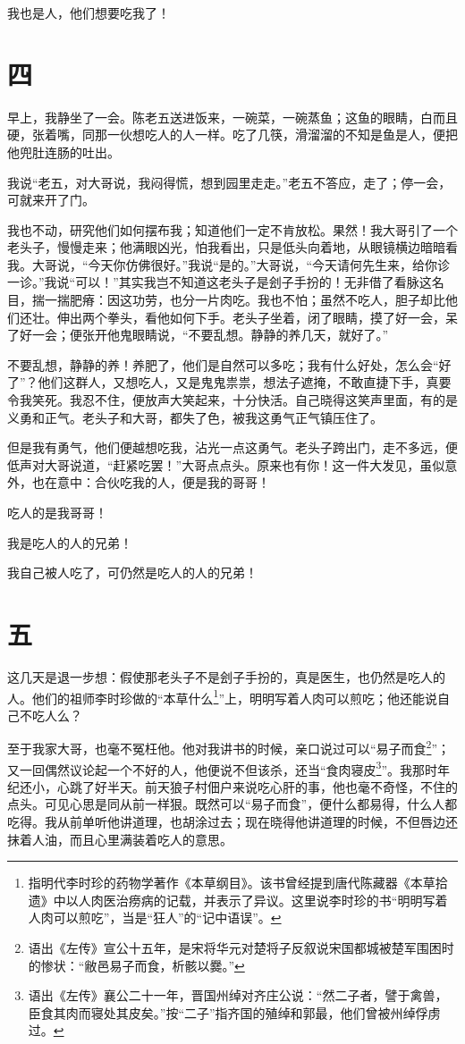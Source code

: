 \documentclass[12pt,UTF8]{ctexbook}
\begin{document}
我也是人，他们想要吃我了！

\section{四}

早上，我静坐了一会。陈老五送进饭来，一碗菜，一碗蒸鱼；这鱼的眼睛，白而且硬，张着嘴，同那一伙想吃人的人一样。吃了几筷，滑溜溜的不知是鱼是人，便把他兜肚连肠的吐出。

我说“老五，对大哥说，我闷得慌，想到园里走走。”老五不答应，走了；停一会，可就来开了门。

我也不动，研究他们如何摆布我；知道他们一定不肯放松。果然！我大哥引了一个老头子，慢慢走来；他满眼凶光，怕我看出，只是低头向着地，从眼镜横边暗暗看我。大哥说，“今天你仿佛很好。”我说“是的。”大哥说，“今天请何先生来，给你诊一诊。”我说“可以！”其实我岂不知道这老头子是刽子手扮的！无非借了看脉这名目，揣一揣肥瘠：因这功劳，也分一片肉吃。我也不怕；虽然不吃人，胆子却比他们还壮。伸出两个拳头，看他如何下手。老头子坐着，闭了眼睛，摸了好一会，呆了好一会；便张开他鬼眼睛说，“不要乱想。静静的养几天，就好了。”

不要乱想，静静的养！养肥了，他们是自然可以多吃；我有什么好处，怎么会“好了”？他们这群人，又想吃人，又是鬼鬼祟祟，想法子遮掩，不敢直捷下手，真要令我笑死。我忍不住，便放声大笑起来，十分快活。自己晓得这笑声里面，有的是义勇和正气。老头子和大哥，都失了色，被我这勇气正气镇压住了。

但是我有勇气，他们便越想吃我，沾光一点这勇气。老头子跨出门，走不多远，便低声对大哥说道，“赶紧吃罢！”大哥点点头。原来也有你！这一件大发见，虽似意外，也在意中：合伙吃我的人，便是我的哥哥！

吃人的是我哥哥！

我是吃人的人的兄弟！

我自己被人吃了，可仍然是吃人的人的兄弟！

\section{五}

这几天是退一步想：假使那老头子不是刽子手扮的，真是医生，也仍然是吃人的人。他们的祖师李时珍做的“本草什么\footnote{指明代李时珍的药物学著作《本草纲目》。该书曾经提到唐代陈藏器《本草拾遗》中以人肉医治痨病的记载，并表示了异议。这里说李时珍的书“明明写着人肉可以煎吃”，当是“狂人”的“记中语误”。}”上，明明写着人肉可以煎吃；他还能说自己不吃人么？

至于我家大哥，也毫不冤枉他。他对我讲书的时候，亲口说过可以“易子而食\footnote{语出《左传》宣公十五年，是宋将华元对楚将子反叙说宋国都城被楚军围困时的惨状：“敝邑易子而食，析骸以爨。”}”；又一回偶然议论起一个不好的人，他便说不但该杀，还当“食肉寝皮\footnote{语出《左传》襄公二十一年，晋国州绰对齐庄公说：“然二子者，譬于禽兽，臣食其肉而寝处其皮矣。”按“二子”指齐国的殖绰和郭最，他们曾被州绰俘虏过。}”。我那时年纪还小，心跳了好半天。前天狼子村佃户来说吃心肝的事，他也毫不奇怪，不住的点头。可见心思是同从前一样狠。既然可以“易子而食”，便什么都易得，什么人都吃得。我从前单听他讲道理，也胡涂过去；现在晓得他讲道理的时候，不但唇边还抹着人油，而且心里满装着吃人的意思。
\end{document}
